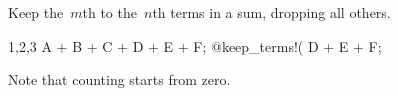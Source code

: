 
Keep the~$m$th to the~$n$th terms in a sum, dropping all others.
\begin{screen}{1,2,3}
A + B + C + D + E + F;
@keep_terms!(%
D + E + F;
\end{screen}
Note that counting starts from zero.

